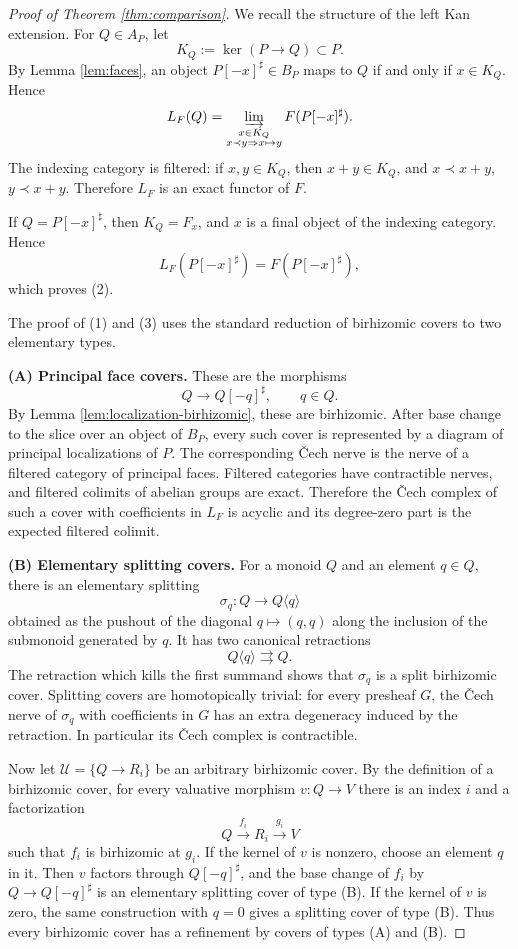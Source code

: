 \documentclass{article}
\theoremstyle{definition}
\begin{document}
\begin{proof}[Proof of Theorem \ref{thm:comparison}]
We recall the structure of the left Kan extension.  For \(Q\in A_P\), let
\[
K_Q:=\ker(P\to Q)\subset P.
\]
By Lemma \ref{lem:faces}, an object \(P[-x]^\sharp\in B_P\) maps to \(Q\) if and only if \(x\in K_Q\).  Hence
\[
L_F(Q)
=
\varinjlim_{\substack{x\in K_Q\\ x\prec y\Rightarrow x\mapsto y}}
F(P[-x]^\sharp).
\]
The indexing category is filtered: if \(x,y\in K_Q\), then \(x+y\in K_Q\), and \(x\prec x+y\), \(y\prec x+y\).  Therefore \(L_F\) is an exact functor of \(F\).

If \(Q=P[-x]^\sharp\), then \(K_Q=F_x\), and \(x\) is a final object of the indexing category.  Hence
\[
L_F(P[-x]^\sharp)=F(P[-x]^\sharp),
\]
which proves (2).

The proof of (1) and (3) uses the standard reduction of birhizomic covers to two elementary types.

\medskip
\noindent\textbf{(A) Principal face covers.}
These are the morphisms
\[
Q\longrightarrow Q[-q]^\sharp,\qquad q\in Q.
\]
By Lemma \ref{lem:localization-birhizomic}, these are birhizomic.  After base change to the slice over an object of \(B_P\), every such cover is represented by a diagram of principal localizations of \(P\).  The corresponding Čech nerve is the nerve of a filtered category of principal faces.  Filtered categories have contractible nerves, and filtered colimits of abelian groups are exact.  Therefore the Čech complex of such a cover with coefficients in \(L_F\) is acyclic and its degree-zero part is the expected filtered colimit.

\medskip
\noindent\textbf{(B) Elementary splitting covers.}
For a monoid \(Q\) and an element \(q\in Q\), there is an elementary splitting
\[
\sigma_q:Q\longrightarrow Q\langle q\rangle
\]
obtained as the pushout of the diagonal \(q\mapsto(q,q)\) along the inclusion of the submonoid generated by \(q\).  It has two canonical retractions
\[
Q\langle q\rangle\rightrightarrows Q.
\]
The retraction which kills the first summand shows that \(\sigma_q\) is a split birhizomic cover.  Splitting covers are homotopically trivial: for every presheaf \(G\), the Čech nerve of \(\sigma_q\) with coefficients in \(G\) has an extra degeneracy induced by the retraction.  In particular its Čech complex is contractible.

\medskip
Now let \(\mathcal U=\{Q\to R_i\}\) be an arbitrary birhizomic cover.  By the definition of a birhizomic cover, for every valuative morphism \(v:Q\to V\) there is an index \(i\) and a factorization
\[
Q\xrightarrow{f_i}R_i\xrightarrow{g_i}V
\]
such that \(f_i\) is birhizomic at \(g_i\).  If the kernel of \(v\) is nonzero, choose an element \(q\) in it.  Then \(v\) factors through \(Q[-q]^\sharp\), and the base change of \(f_i\) by \(Q\to Q[-q]^\sharp\) is an elementary splitting cover of type (B).  If the kernel of \(v\) is zero, the same construction with \(q=0\) gives a splitting cover of type (B).  Thus every birhizomic cover has a refinement by covers of types (A) and (B).


\end{proof}
\end{document}
